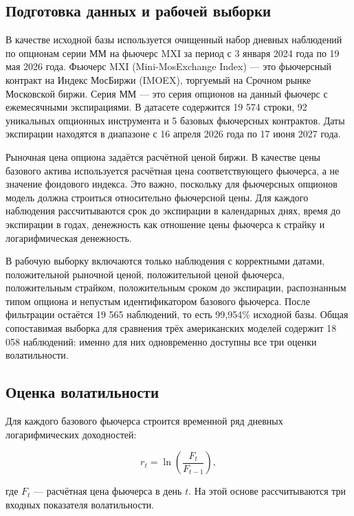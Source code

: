 \documentclass[11pt,a4paper]{article}
\begin{document}
\subsection{Подготовка данных и рабочей выборки}

В качестве исходной базы используется очищенный набор дневных наблюдений по опционам серии ММ на фьючерс MXI за период с 3 января 2024 года по 19 мая 2026 года. Фьючерс MXI (Mini-MosExchange Index) --- это фьючерсный контракт на Индекс МосБиржи (IMOEX), торгуемый на Срочном рынке Московской биржи. Серия ММ --- это серия опционов на данный фьючерс с ежемесячными экспирациями. В датасете содержится 19 574 строки, 92 уникальных опционных инструмента и 5 базовых фьючерсных контрактов. Даты экспирации находятся в диапазоне с 16 апреля 2026 года по 17 июня 2027 года.

Рыночная цена опциона задаётся расчётной ценой биржи. В качестве цены базового актива используется расчётная цена соответствующего фьючерса, а не значение фондового индекса. Это важно, поскольку для фьючерсных опционов модель должна строиться относительно фьючерсной цены. Для каждого наблюдения рассчитываются срок до экспирации в календарных днях, время до экспирации в годах, денежность как отношение цены фьючерса к страйку и логарифмическая денежность.

В рабочую выборку включаются только наблюдения с корректными датами, положительной рыночной ценой, положительной ценой фьючерса, положительным страйком, положительным сроком до экспирации, распознанным типом опциона и непустым идентификатором базового фьючерса. После фильтрации остаётся 19 565 наблюдений, то есть 99,954\% исходной базы. Общая сопоставимая выборка для сравнения трёх американских моделей содержит 18 058 наблюдений: именно для них одновременно доступны все три оценки волатильности.

\subsection{Оценка волатильности}

Для каждого базового фьючерса строится временной ряд дневных логарифмических доходностей:

\begin{equation}
r_t = \ln\left(\frac{F_t}{F_{t-1}}\right),
\end{equation}

где $F_t$ --- расчётная цена фьючерса в день $t$. На этой основе рассчитываются три входных показателя волатильности.
\end{document}
